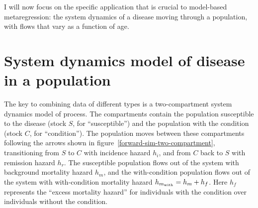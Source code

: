 








I will now focus on the specific application that is crucial to
model-based metaregression: the system dynamics of a disease moving
through a population, with flows that vary as a function of age.

\section{System dynamics model of disease in a population}
\label{sys-dynamics}
The key to combining data of different types is a two-compartment
system dynamics model of process. The compartments contain the
population susceptible to the disease (stock $S$, for ``susceptible'')
and the population with the condition (stock $C$, for
``condition''). The population moves between these compartments
following the arrows shown in
figure~\ref{forward-sim-two-compartment}, transitioning from $S$ to
$C$ with incidence hazard $h_i$, and from $C$ back to $S$ with
remission hazard $h_r$. The susceptible population flows out of the
system with background mortality hazard $h_m$, and the with-condition
population flows out of the system with with-condition mortality
hazard $h_{m_{\text{with}}} = h_m+h_f$.  Here $h_f$ represents the ``excess
mortality hazard'' for individuals with the condition over individuals
without the condition.\cite{barendregt_generic_2003}

